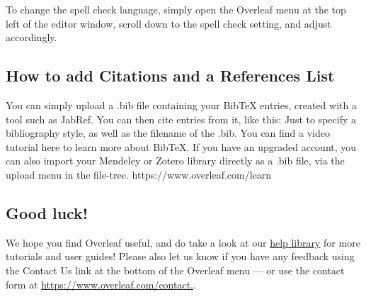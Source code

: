 \documentclass{article}
\begin{document}
   To change the spell check language, simply open the Overleaf menu at the top left of the editor window, scroll down to the spell check setting, and adjust accordingly.
   \subsection{How to add Citations and a References List}
You can simply upload a .bib file containing your BibTeX entries, created with a tool such as JabRef.
You can then cite entries from it, like this:  Just \cite{ulversoy2010software} to specify a bibliography style, as
well as the filename of the .bib. You can find a video tutorial here to learn more about BibTeX.
If you have an upgraded account, you can also import your Mendeley or Zotero library directly as
a .bib file, via the upload menu in the file-tree.
https://www.overleaf.com/learn
\subsection{ Good luck!}
We hope you find Overleaf useful, and do take a look at our \href{https://www.overleaf.com/learn}{help library} for more tutorials and user
guides! Please also let us know if you have any feedback using the Contact Us link at the bottom of
the Overleaf menu — or use the contact form at \href{https://www.overleaf.com/contact.}{https://www.overleaf.com/contact.}.



\end{document}
